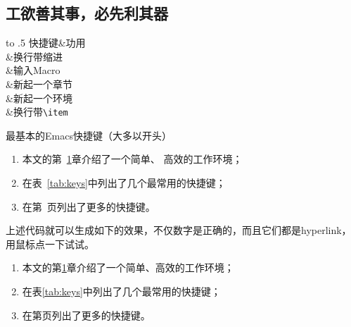 \begin{codeblock}[.9]
\begin{latexcode}
  \chapter{工欲善其事，必先利其器}
  \label{cha:pre-requisite}   %

  \begin{table}[!htbp]
    \centering
    \caption{常用快捷键}\label{tab:keys}  %
    \begin{tabu*}to .5\textwidth {X[r]|X[l]}
      \hline
      \rowfont[c]{\bfseries}快捷键&功用\\\hline
      \Cj{}&换行带缩进\\
      \Cc\Cm{}&输入Macro\\
      \Cc\Cs{}&新起一个章节\\
      \Cc\Ce{}&新起一个环境\\
      \MEnter{}&换行带{\verb|\item|}\\\hline
    \end{tabu*}
  \end{table}

  最基本的Emacs快捷键（大多以\Cx{}开头）\label{p:keys} %

  
  \begin{enumerate}
  \item 本文的第~\ref{cha:pre-requisite}章介绍了一个简单、%
    高效的工作环境；
  \item 在表~\ref{tab:keys}中列出了几个最常用的快捷键； %
  \item 在第~\pageref{p:keys}页列出了更多的快捷键。    %
  \end{enumerate}
\end{latexcode}
\end{codeblock}

上述代码就可以生成如下的效果，不仅数字是正确的，而且它们都是hyperlink，用鼠标点一下试试。

\begin{enumerate}
\item 本文的第\ref{cha:pre-requisite}章介绍了一个简单、高效的工作环境；
\item 在表\ref{tab:keys}中列出了几个最常用的快捷键；
\item 在第\pageref{p:keys}页列出了更多的快捷键。
\end{enumerate}

